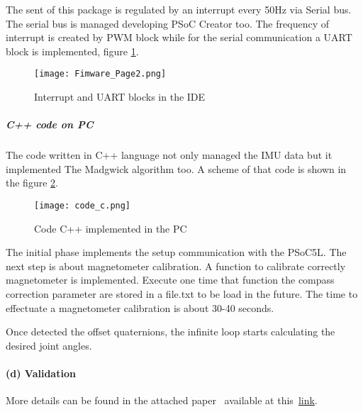 \begin{enumerate}
\noindent The sent of this package is regulated by an interrupt every 50Hz via Serial bus.  The serial bus is managed developing PSoC Creator too. The frequency of interrupt is created by PWM block while for the serial communication a UART block is implemented, figure \ref{fig:firmwarepage1}.
\begin{figure}[h]
\centering
\texttt{[image: Fimware\_Page2.png]}
\caption{Interrupt and UART blocks in the IDE}
\label{fig:firmwarepage1}
\end{figure}  
\end{enumerate} 

\subparagraph{C++ code on PC}
The code written in C++ language not only managed the IMU data but it implemented The Madgwick algorithm too. A scheme of that code is shown in the figure \ref{fig:code_c}.  
\begin{figure}[h]
\centering
\texttt{[image: code\_c.png]}
\caption{Code C++ implemented in the PC}
\label{fig:code_c}
\end{figure}  

The initial phase implements the setup communication with the PSoC5L. The next step is about magnetometer calibration. A function to calibrate correctly magnetometer is implemented. Execute one time that function the compass correction parameter are stored in a file.txt to be load in the future. The time to effectuate a magnetometer calibration is about 30-40 seconds. 

Once detected the offset quaternions, the infinite loop starts calculating the desired joint angles. 
\paragraph{(d) Validation}

More details can be found in the attached paper~\cite{Santaera:ICRA:2015} available at this~\href{./attachedPapers/ReconstructionPosturesImuMeasurements.pdf}{link}.
